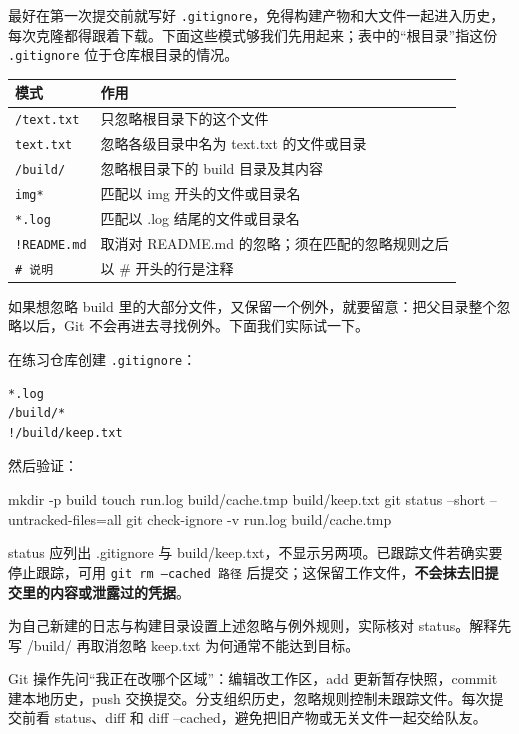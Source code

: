 最好在第一次提交前就写好 \texttt{.gitignore}，免得构建产物和大文件一起进入历史，每次克隆都得跟着下载。下面这些模式够我们先用起来；表中的“根目录”指这份 \texttt{.gitignore} 位于仓库根目录的情况。
\begin{center}
\small
\begin{tabular}{>{\raggedright\arraybackslash}p{}>{\raggedright\arraybackslash}p{}}
\toprule
模式 & 作用\\
\midrule
\texttt{/text.txt} & 只忽略根目录下的这个文件\\
\texttt{text.txt} & 忽略各级目录中名为 text.txt 的文件或目录\\
\texttt{/build/} & 忽略根目录下的 build 目录及其内容\\
\texttt{img*} & 匹配以 img 开头的文件或目录名\\
\texttt{*.log} & 匹配以 .log 结尾的文件或目录名\\
\texttt{!README.md} & 取消对 README.md 的忽略；须在匹配的忽略规则之后\\
\texttt{\# 说明} & 以 \# 开头的行是注释\\
\bottomrule
\end{tabular}
\end{center}
如果想忽略 build 里的大部分文件，又保留一个例外，就要留意：把父目录整个忽略以后，Git 不会再进去寻找例外。下面我们实际试一下。
\begin{example}
在练习仓库创建 \texttt{.gitignore}：
\begin{lstlisting}[language={},frame=single]
*.log
/build/*
!/build/keep.txt
\end{lstlisting}
然后验证：

\begin{tbash}
mkdir -p build
touch run.log build/cache.tmp build/keep.txt
git status --short --untracked-files=all
git check-ignore -v run.log build/cache.tmp
\end{tbash}

status 应列出 .gitignore 与 build/keep.txt，不显示另两项。已跟踪文件若确实要停止跟踪，可用 \texttt{git rm --cached 路径} 后提交；这保留工作文件，\textbf{不会抹去旧提交里的内容或泄露过的凭据}。
\end{example}
\begin{exercise}\label{ex:v1-git-ignore}
为自己新建的日志与构建目录设置上述忽略与例外规则，实际核对 status。解释先写 /build/ 再取消忽略 keep.txt 为何通常不能达到目标。
\end{exercise}
\begin{conclusion}
Git 操作先问“我正在改哪个区域”：编辑改工作区，add 更新暂存快照，commit 建本地历史，push 交换提交。分支组织历史，忽略规则控制未跟踪文件。每次提交前看 status、diff 和 diff --cached，避免把旧产物或无关文件一起交给队友。
\end{conclusion}

